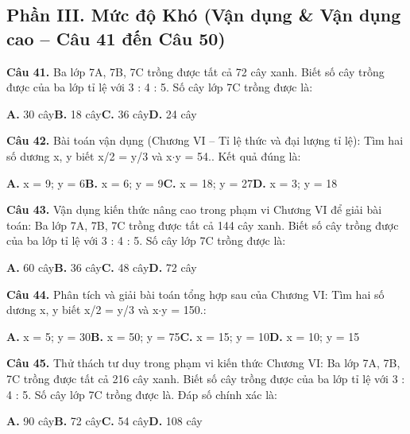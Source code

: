 \documentclass[11pt,a4paper]{article}
\begin{document}
\subsection*{\color{accent} Phần III. Mức độ Khó (Vận dụng \& Vận dụng cao -- Câu 41 đến Câu 50)}
\textbf{\color{primary} Câu 41.} Ba lớp 7A, 7B, 7C trồng được tất cả 72 cây xanh. Biết số cây trồng được của ba lớp tỉ lệ với 3 : 4 : 5. Số cây lớp 7C trồng được là:\par
\hspace*{1.5em}\textbf{A.} 30 cây\quad\quad \textbf{B.} 18 cây\quad\quad \textbf{C.} 36 cây\quad\quad \textbf{D.} 24 cây\par\vspace{2pt}
\textbf{\color{primary} Câu 42.} Bài toán vận dụng (Chương VI – Tỉ lệ thức và đại lượng tỉ lệ): Tìm hai số dương x, y biết x/2 = y/3 và x$\cdot$y = 54.. Kết quả đúng là:\par
\hspace*{1.5em}\textbf{A.} x = 9; y = 6\quad\quad \textbf{B.} x = 6; y = 9\quad\quad \textbf{C.} x = 18; y = 27\quad\quad \textbf{D.} x = 3; y = 18\par\vspace{2pt}
\textbf{\color{primary} Câu 43.} Vận dụng kiến thức nâng cao trong phạm vi Chương VI để giải bài toán: Ba lớp 7A, 7B, 7C trồng được tất cả 144 cây xanh. Biết số cây trồng được của ba lớp tỉ lệ với 3 : 4 : 5. Số cây lớp 7C trồng được là:\par
\hspace*{1.5em}\textbf{A.} 60 cây\quad\quad \textbf{B.} 36 cây\quad\quad \textbf{C.} 48 cây\quad\quad \textbf{D.} 72 cây\par\vspace{2pt}
\textbf{\color{primary} Câu 44.} Phân tích và giải bài toán tổng hợp sau của Chương VI: Tìm hai số dương x, y biết x/2 = y/3 và x$\cdot$y = 150.:\par
\hspace*{1.5em}\textbf{A.} x = 5; y = 30\quad\quad \textbf{B.} x = 50; y = 75\quad\quad \textbf{C.} x = 15; y = 10\quad\quad \textbf{D.} x = 10; y = 15\par\vspace{2pt}
\textbf{\color{primary} Câu 45.} Thử thách tư duy trong phạm vi kiến thức Chương VI: Ba lớp 7A, 7B, 7C trồng được tất cả 216 cây xanh. Biết số cây trồng được của ba lớp tỉ lệ với 3 : 4 : 5. Số cây lớp 7C trồng được là. Đáp số chính xác là:\par
\hspace*{1.5em}\textbf{A.} 90 cây\quad\quad \textbf{B.} 72 cây\quad\quad \textbf{C.} 54 cây\quad\quad \textbf{D.} 108 cây\par\vspace{2pt}
\end{document}
